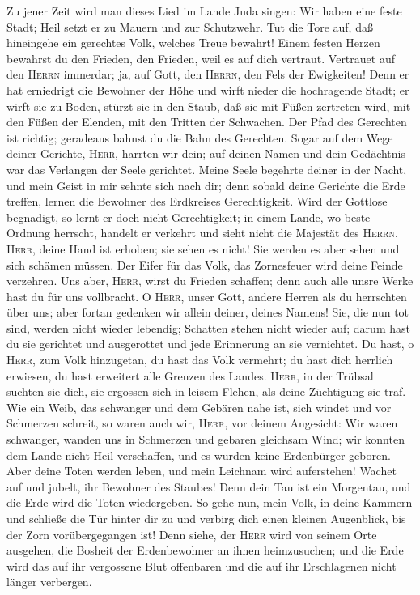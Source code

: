  Zu jener Zeit wird man dieses Lied im Lande Juda singen:
Wir haben eine feste Stadt; Heil setzt er zu Mauern und zur Schutzwehr.
 Tut die Tore auf, daß hineingehe ein gerechtes Volk,
welches Treue bewahrt!  Einem festen Herzen bewahrst du
den Frieden, den Frieden, weil es auf dich vertraut. 
Vertrauet auf den \textsc{Herrn} immerdar; ja, auf Gott, den
\textsc{Herrn}, den Fels der Ewigkeiten!  Denn er hat
erniedrigt die Bewohner der Höhe und wirft nieder die hochragende Stadt;
er wirft sie zu Boden, stürzt sie in den Staub,  daß sie
mit Füßen zertreten wird, mit den Füßen der Elenden, mit den Tritten der
Schwachen.  Der Pfad des Gerechten ist richtig; geradeaus
bahnst du die Bahn des Gerechten.  Sogar auf dem Wege
deiner Gerichte, \textsc{Herr}, harrten wir dein; auf deinen Namen und
dein Gedächtnis war das Verlangen der Seele gerichtet. 
Meine Seele begehrte deiner in der Nacht, und mein Geist in mir sehnte
sich nach dir; denn sobald deine Gerichte die Erde treffen, lernen die
Bewohner des Erdkreises Gerechtigkeit.  Wird der Gottlose
begnadigt, so lernt er doch nicht Gerechtigkeit; in einem Lande, wo
beste Ordnung herrscht, handelt er verkehrt und sieht nicht die Majestät
des \textsc{Herrn}.  \textsc{Herr}, deine Hand ist
erhoben; sie sehen es nicht! Sie werden es aber sehen und sich schämen
müssen. Der Eifer für das Volk, das Zornesfeuer wird deine Feinde
verzehren.  Uns aber, \textsc{Herr}, wirst du Frieden
schaffen; denn auch alle unsre Werke hast du für uns vollbracht.
 O \textsc{Herr}, unser Gott, andere Herren als du
herrschten über uns; aber fortan gedenken wir allein deiner, deines
Namens!  Sie, die nun tot sind, werden nicht wieder
lebendig; Schatten stehen nicht wieder auf; darum hast du sie gerichtet
und ausgerottet und jede Erinnerung an sie vernichtet. 
Du hast, o \textsc{Herr}, zum Volk hinzugetan, du hast das Volk
vermehrt; du hast dich herrlich erwiesen, du hast erweitert alle Grenzen
des Landes.  \textsc{Herr}, in der Trübsal suchten sie
dich, sie ergossen sich in leisem Flehen, als deine Züchtigung sie traf.
 Wie ein Weib, das schwanger und dem Gebären nahe ist,
sich windet und vor Schmerzen schreit, so waren auch wir, \textsc{Herr},
vor deinem Angesicht:  Wir waren schwanger, wanden uns in
Schmerzen und gebaren gleichsam Wind; wir konnten dem Lande nicht Heil
verschaffen, und es wurden keine Erdenbürger geboren. 
Aber deine Toten werden leben, und mein Leichnam wird auferstehen!
Wachet auf und jubelt, ihr Bewohner des Staubes! Denn dein Tau ist ein
Morgentau, und die Erde wird die Toten wiedergeben.  So
gehe nun, mein Volk, in deine Kammern und schließe die Tür hinter dir zu
und verbirg dich einen kleinen Augenblick, bis der Zorn vorübergegangen
ist!  Denn siehe, der \textsc{Herr} wird von seinem Orte
ausgehen, die Bosheit der Erdenbewohner an ihnen heimzusuchen; und die
Erde wird das auf ihr vergossene Blut offenbaren und die auf ihr
Erschlagenen nicht länger verbergen.

